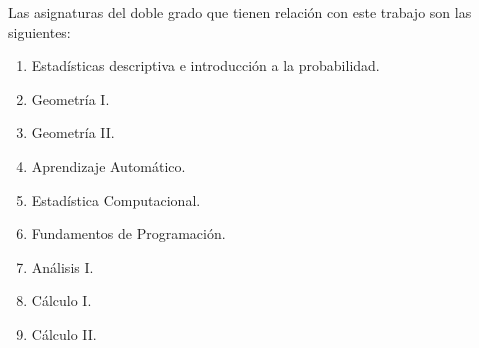 Las asignaturas del doble grado que tienen relación con este trabajo son las siguientes:
\begin{enumerate}
\item Estadísticas descriptiva e introducción a la probabilidad.
\item Geometría I.
\item Geometría II.
\item Aprendizaje Automático.
\item Estadística Computacional.
\item Fundamentos de Programación.
\item Análisis I.
\item Cálculo I.
\item Cálculo II.
\end{enumerate}